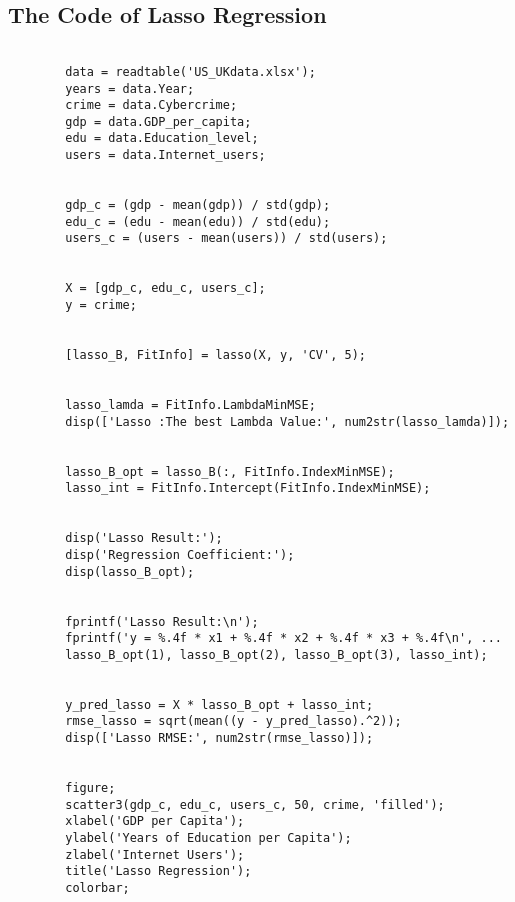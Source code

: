 \documentclass[12pt]{article}
\begin{document}
	\subsection{The Code of Lasso Regression}
	\begin{verbatim}
		
		data = readtable('US_UKdata.xlsx'); 
		years = data.Year;  
		crime = data.Cybercrime;  
		gdp = data.GDP_per_capita;  
		edu = data.Education_level;  
		users = data.Internet_users;  
		
		
		gdp_c = (gdp - mean(gdp)) / std(gdp);  
		edu_c = (edu - mean(edu)) / std(edu);  
		users_c = (users - mean(users)) / std(users);  
		
		
		X = [gdp_c, edu_c, users_c];  
		y = crime;  
		
		
		[lasso_B, FitInfo] = lasso(X, y, 'CV', 5);  
		
		
		lasso_lamda = FitInfo.LambdaMinMSE;  
		disp(['Lasso :The best Lambda Value:', num2str(lasso_lamda)]);
		
		
		lasso_B_opt = lasso_B(:, FitInfo.IndexMinMSE); 
		lasso_int = FitInfo.Intercept(FitInfo.IndexMinMSE);  
		
		
		disp('Lasso Result:');
		disp('Regression Coefficient:');
		disp(lasso_B_opt);
		
		
		fprintf('Lasso Result:\n');
		fprintf('y = %.4f * x1 + %.4f * x2 + %.4f * x3 + %.4f\n', ...
		lasso_B_opt(1), lasso_B_opt(2), lasso_B_opt(3), lasso_int);
		
		
		y_pred_lasso = X * lasso_B_opt + lasso_int;  
		rmse_lasso = sqrt(mean((y - y_pred_lasso).^2));  
		disp(['Lasso RMSE:', num2str(rmse_lasso)]);
		
		
		figure;
		scatter3(gdp_c, edu_c, users_c, 50, crime, 'filled');
		xlabel('GDP per Capita');
		ylabel('Years of Education per Capita');
		zlabel('Internet Users');
		title('Lasso Regression');
		colorbar;
		
		\end{verbatim}
\end{document}
